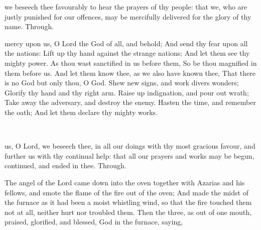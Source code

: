 
\collect
{} we beseech thee favourably to hear the prayers of thy people: that we, who are justly punished for our offences, may be mercifully delivered for the glory of thy name. Through.

 mercy upon us, O Lord the God of all, and behold; And send thy fear upon all the nations: Lift up thy hand against the strange nations; And let them see thy mighty power. As thou wast sanctified in us before them, So be thou magnified in them before us. And let them know thee, as we also have known thee, That there is no God but only thou, O God. Shew new signs, and work divers wonders; Glorify thy hand and thy right arm. Raise up indignation, and pour out wrath; Take away the adversary, and destroy the enemy. Hasten the time, and remember the oath; And let them declare thy mighty works.

\\


\collect
{} us, O Lord, we beseech thee, in all our doings with thy most gracious favour, and further us with thy continual help: that all our prayers and works may be begun, continued, and ended in thee. Through.

 The angel of the Lord came down into the oven together with Azarias and his fellows, and smote the flame of the fire out of the oven; And made the midst of the furnace as it had been a moist whistling wind, so that the fire touched them not at all, neither hurt nor troubled them. Then the three, as out of one mouth, praised, glorified, and blessed, God in the furnace, saying,

